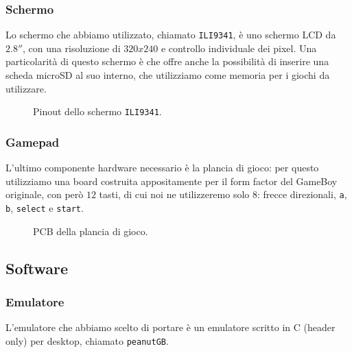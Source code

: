 \documentclass[12pt]{article}
\begin{document}
\subsubsection{Schermo}
Lo schermo che abbiamo utilizzato, chiamato \texttt{ILI9341}, è uno schermo LCD
da $2.8''$, con una risoluzione di $320x240$ e controllo individuale dei pixel.
Una particolarità di questo schermo è che offre anche la possibilità di inserire
una scheda microSD al suo interno, che utilizziamo come memoria per i giochi da
utilizzare. 
\begin{figure}[h]
	\begin{center}
		\begin{tikzpicture}[x=0.015cm, y=0.015cm, scale=0.5, transform shape]
			
		\end{tikzpicture}
	\end{center}
	\caption{Pinout dello schermo \texttt{ILI9341}.}
	\label{fig:pinout_ili}

\end{figure}

\subsubsection{Gamepad}
L'ultimo componente hardware necessario è la plancia di gioco: per questo
utilizziamo una board costruita appositamente per il form factor del GameBoy
originale, con però $12$ tasti, di cui noi ne utilizzeremo solo $8$: frecce
direzionali, \texttt{a}, \texttt{b}, \texttt{select} e \texttt{start}.
\begin{figure}[h]
	\begin{center}
		\begin{tikzpicture}[x=0.75pt, y=0.75pt, scale=1]
			
		\end{tikzpicture}
	\end{center}
	\caption{PCB della plancia di gioco.}
	\label{fig:pinout_pcb}
\end{figure}



\subsection{Software}
\subsubsection{Emulatore}
L'emulatore che abbiamo scelto di portare è un emulatore scritto in C (header
only) per desktop, chiamato \texttt{peanutGB}. 
\end{document}
